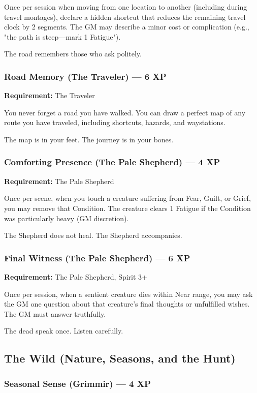 Once per session when moving from one location to another (including during travel montages), declare a hidden shortcut that reduces the remaining travel clock by 2 segments. The GM may describe a minor cost or complication (e.g., "the path is steep—mark 1 Fatigue").

The road remembers those who ask politely.

\subsubsection{Road Memory (The Traveler) — 6 XP}

\textbf{Requirement:} The Traveler

You never forget a road you have walked. You can draw a perfect map of any route you have traveled, including shortcuts, hazards, and waystations.

The map is in your feet. The journey is in your bones.

\subsubsection{Comforting Presence (The Pale Shepherd) — 4 XP}

\textbf{Requirement:} The Pale Shepherd

Once per scene, when you touch a creature suffering from Fear, Guilt, or Grief, you may remove that Condition. The creature clears 1 Fatigue if the Condition was particularly heavy (GM discretion).

The Shepherd does not heal. The Shepherd accompanies.

\subsubsection{Final Witness (The Pale Shepherd) — 6 XP}

\textbf{Requirement:} The Pale Shepherd, Spirit 3+

Once per session, when a sentient creature dies within Near range, you may ask the GM one question about that creature's final thoughts or unfulfilled wishes. The GM must answer truthfully.

The dead speak once. Listen carefully.

\subsection{The Wild (Nature, Seasons, and the Hunt)}

\subsubsection{Seasonal Sense (Grimmir) — 4 XP}

